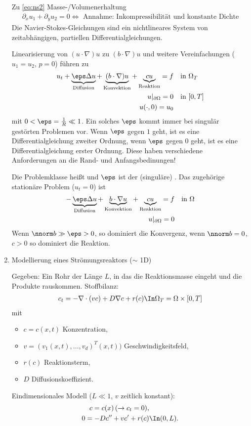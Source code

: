 \begin{enumerate}
Zu \eqref{eq:ns2} Masse-/Volumenerhaltung
\begin{align*}
  \partial_{x} u_{1} +   \partial_{y} u_{2} = 0 \iff \text{ Annahme: Inkompressibilität und konstante Dichte}
\end{align*}
Die Navier-Stokes-Gleichungen sind ein nichtlineares System von zeitabhängigen, partiellen Differentialgleichungen. 

Linearisierung von $(u\cdot\nabla)u$ zu $(b\cdot\nabla)u$ und weitere Vereinfachungen ($u_{1} = u_{2}$, $p = 0$) führen zu 
\begin{align*}
    u_{t} + \underbrace{\eps\Delta u}_{\text{Diffusion}} + \underbrace{(b\cdot\nabla)u}_{\text{Konvektion}} + \underbrace{cu}_{\text{Reaktion}} = f&\quad \text{in } \Omega_{T}\\
u|_{\partial \Omega} = 0& \quad \text{in } [0, T]\\
u(\cdot, 0) = u_{0}&
\end{align*}
mit $0 < \eps = \frac 1 R \ll 1$. 
Ein solches $\eps$ kommt immer bei singulär gestörten Problemen vor. Wenn $\eps$ gegen $1$ geht, ist es eine Differentialgleichung zweiter Ordnung, wenn $\eps$ gegen $0$ geht, ist es eine Differentialgleichung erster Ordnung. Diese haben verschiedene Anforderungen an die Rand- und Anfangsbedinungen!

Die Problemklasse heißt  und $\eps$ ist der (singuläre) . Das zugehörige stationäre Problem ($u_{t} = 0$) ist
\begin{align*}
   -\underbrace{\eps\Delta u}_{\text{Diffusion}} + \underbrace{b\cdot\nabla u}_{\text{Konvektion}} + \underbrace{cu}_{\text{Reaktion}} = f&\quad \text{in } \Omega\\
u|_{\partial \Omega} = 0& 
\end{align*}
Wenn $\nnorm b \gg \eps > 0$, so  dominiert die Konvergenz, wenn $\nnorm b = 0$, $c > 0$ so dominiert die Reaktion. 
\item Modellierung eines Strömungsreaktors ($\sim$ 1D)

Gegeben: Ein Rohr der Länge $L$, in das die Reaktionsmasse eingeht und die Produkte rauskommen. 
Stoffbilanz:
\begin{align*}
  c_{t} = - \nabla \cdot(v c) + D \nabla c + r(c) \In \Omega_{T} = \Omega \times [0, T]
\end{align*}
mit
\begin{itemize}
\item $c = c(x, t)$ Konzentration, 
\item $v = (v_{1}(x, t), \dots, v_{d})^{T}(x, t))$ Geschwindigkeitsfeld, 
\item $r(c)$ Reaktionsterm, 
\item $D$ Diffusionskoeffizient. 
\end{itemize}
Eindimensionales Modell ($L \ll 1$, $v$ zeitlich konstant):
\begin{align*}
  c = c(x) \, (\to c_{t} = 0), &\\
0 = - Dc'' + vc' + r(c)& \In (0, L). 
\end{align*}

\end{enumerate}

